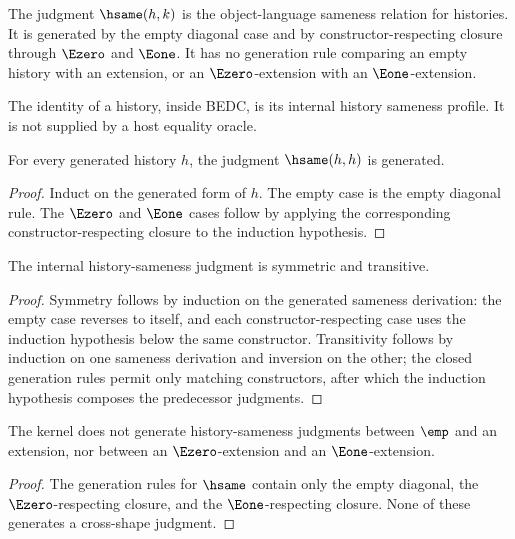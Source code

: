\begin{definition}
\label{def:philosophy-internal-history-sameness}
The judgment \(\hsame(h,k)\) is the object-language sameness relation
for histories. It is generated by the empty diagonal case and by
constructor-respecting closure through \(\Ezero\) and \(\Eone\). It has
no generation rule comparing an empty history with an extension, or an
\(\Ezero\)-extension with an \(\Eone\)-extension.
\end{definition}

\begin{definition}
\label{def:philosophy-history-identity}
The identity of a history, inside BEDC, is its internal history
sameness profile. It is not supplied by a host equality oracle.
\end{definition}

\begin{theorem}
\label{thm:philosophy-history-sameness-reflexive}
For every generated history \(h\), the judgment \(\hsame(h,h)\) is
generated.
\end{theorem}
\begin{proof}
Induct on the generated form of \(h\). The empty case is the empty
diagonal rule. The \(\Ezero\) and \(\Eone\) cases follow by applying
the corresponding constructor-respecting closure to the induction
hypothesis.
\end{proof}

\begin{theorem}
\label{thm:philosophy-history-sameness-symmetric-transitive}
The internal history-sameness judgment is symmetric and transitive.
\end{theorem}
\begin{proof}
Symmetry follows by induction on the generated sameness derivation:
the empty case reverses to itself, and each constructor-respecting case
uses the induction hypothesis below the same constructor. Transitivity
follows by induction on one sameness derivation and inversion on the
other; the closed generation rules permit only matching constructors,
after which the induction hypothesis composes the predecessor
judgments.
\end{proof}

\begin{theorem}
\label{thm:philosophy-history-no-confusion}
The kernel does not generate history-sameness judgments between
\(\emp\) and an extension, nor between an \(\Ezero\)-extension and an
\(\Eone\)-extension.
\end{theorem}
\begin{proof}
The generation rules for \(\hsame\) contain only the empty diagonal,
the \(\Ezero\)-respecting closure, and the \(\Eone\)-respecting
closure. None of these generates a cross-shape judgment.
\end{proof}

